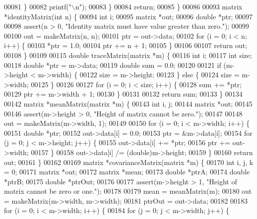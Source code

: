\begin{DoxyCode}
{{00081     \}
00082     printf(\textcolor{stringliteral}{"\(\backslash\)n"});
00083   \}
00084   \textcolor{keywordflow}{return};
00085 \}
00086 
00093 matrix *identityMatrix(\textcolor{keywordtype}{int} n) \{
00094   \textcolor{keywordtype}{int} i;
00095   matrix *out;
00096   \textcolor{keywordtype}{double} *ptr;
00097 
00098   assert(n > 0, \textcolor{stringliteral}{"Identity matrix must have value greater than zero."});
00099 
00100   out = makeMatrix(n, n);
00101   ptr = out->data;
00102   \textcolor{keywordflow}{for} (i = 0; i < n; i++) \{
00103     *ptr = 1.0;
00104     ptr += n + 1;
00105   \}
00106 
00107   \textcolor{keywordflow}{return} out;
00108 \}
00109 
00115 \textcolor{keywordtype}{double} traceMatrix(matrix *m) \{
00116   \textcolor{keywordtype}{int} i;
00117   \textcolor{keywordtype}{int} size;
00118   \textcolor{keywordtype}{double} *ptr = m->data;
00119   \textcolor{keywordtype}{double} sum = 0.0;
00120 
00121   \textcolor{keywordflow}{if} (m->height < m->width) \{
00122     size = m->height;
00123   \} \textcolor{keywordflow}{else} \{
00124     size = m->width;
00125   \}
00126 
00127   \textcolor{keywordflow}{for} (i = 0; i < size; i++) \{
00128     sum += *ptr;
00129     ptr += m->width + 1;
00130   \}
00131 
00132   \textcolor{keywordflow}{return} sum;
00133 \}
00134 
00142 matrix *meanMatrix(matrix *m) \{
00143   \textcolor{keywordtype}{int} i, j;
00144   matrix *out;
00145 
00146   assert(m->height > 0, \textcolor{stringliteral}{"Height of matrix cannot be zero."});
00147 
00148   out = makeMatrix(m->width, 1);
00149 
00150   \textcolor{keywordflow}{for} (i = 0; i < m->width; i++) \{
00151     \textcolor{keywordtype}{double} *ptr;
00152     out->data[i] = 0.0;
00153     ptr = &m->data[i];
00154     \textcolor{keywordflow}{for} (j = 0; j < m->height; j++) \{
00155       out->data[i] += *ptr;
00156       ptr += out->width;
00157     \}
00158     out->data[i] /= (double)m->height;
00159   \}
00160   \textcolor{keywordflow}{return} out;
00161 \}
00162 
00169 matrix *covarianceMatrix(matrix *m) \{
00170   \textcolor{keywordtype}{int} i, j, k = 0;
00171   matrix *out;
00172   matrix *mean;
00173   \textcolor{keywordtype}{double} *ptrA;
00174   \textcolor{keywordtype}{double} *ptrB;
00175   \textcolor{keywordtype}{double} *ptrOut;
00176 
00177   assert(m->height > 1, \textcolor{stringliteral}{"Height of matrix cannot be zero or one."});
00178 
00179   mean = meanMatrix(m);
00180   out = makeMatrix(m->width, m->width);
00181   ptrOut = out->data;
00182 
00183   \textcolor{keywordflow}{for} (i = 0; i < m->width; i++) \{
00184     \textcolor{keywordflow}{for} (j = 0; j < m->width; j++) \{
}}
\end{DoxyCode}
